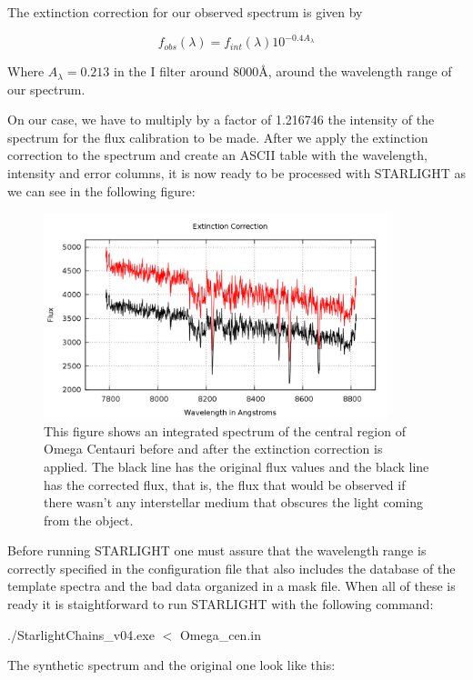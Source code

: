 The extinction correction for our observed spectrum is given by

\begin{equation}
f_{obs}(\lambda)=f_{int}(\lambda)10^{-0.4A_{\lambda}}
\end{equation}

Where $A_{\lambda}=0.213$ in the I filter around $8000 \textrm{\AA}$, around the wavelength range of our spectrum. 

On our case, we have to multiply by a factor of 1.216746 the intensity of the spectrum for the flux calibration to be made. After we apply the extinction correction to the spectrum and create an ASCII table with the wavelength, intensity and error columns, it is now ready to be processed with STARLIGHT as we can see in the following figure:

\begin{figure}[H]
\centering
\includegraphics[width=10cm]{images/extinction.png}
\caption[Extinction Correction]{This figure shows an integrated spectrum of the central region of Omega Centauri before and after the extinction correction is applied. The black line has the original flux values and the black line has the corrected flux, that is, the flux that would be observed if there wasn't any interstellar medium that obscures the light coming from the object.}
\end{figure}

Before running STARLIGHT one must assure that the wavelength range is correctly specified in the configuration file that also includes the database of the template spectra and the bad data organized in a mask file. When all of these is ready it is staightforward to run STARLIGHT with the following command:

\begin{center}
./StarlightChains\_v04.exe $<$ Omega\_cen.in
\end{center}

The synthetic spectrum and the original one look like this:

